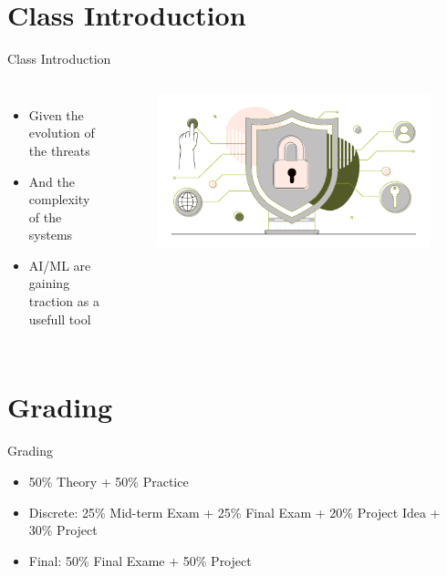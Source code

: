 \documentclass[hyperref={hidelinks}]{beamer}
\begin{document}
  \section{Class Introduction}
  \begin{frame}{Class Introduction}
    \begin{columns}
      \begin{itemize}
        \item Given the evolution of the threats
        \item And the complexity of the systems
        \item AI/ML are gaining traction as a usefull tool
      \end{itemize}
      \begin{figure}
      \centering
      \includegraphics[width=\textwidth]{security}
      \end{figure}
    \end{columns}  
  \end{frame}

  \section{Grading}
  \begin{frame}[allowframebreaks]{Grading}
    \begin{itemize}
      \item 50\% Theory + 50\% Practice 
      \item Discrete: 25\% Mid-term Exam + 25\% Final Exam + 20\% Project Idea + 30\% Project
      \item Final: 50\% Final Exame + 50\% Project 
    \end{itemize}
  \end{frame}
\end{document}
